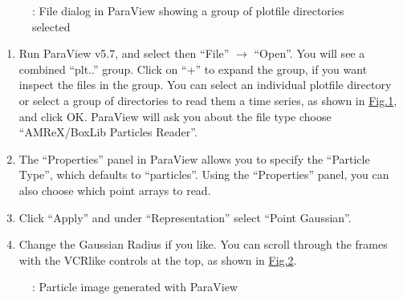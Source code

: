 \documentclass[letterpaper,10pt,english]{sphinxmanual}
\begin{document}
\begin{center}

\begin{figure}[htbp]
\centering
\capstart

\noindent{}
\caption{: File dialog in ParaView showing a group of plotfile directories selected}\label{\detokenize{Visualization:id6}}\label{\detokenize{Visualization:fig-paraview-filegroup}}\end{figure}

\end{center}
\begin{enumerate}
%
\item {} 
\sphinxAtStartPar
Run ParaView v5.7, and select  then  “File” \(\rightarrow\) “Open”. You
will see a combined “plt..” group. Click on “+” to expand the group, if you
want inspect the files in the group. You can select an individual plotfile
directory or select a group of directories to read them a time series, as
shown in \hyperref[\detokenize{Visualization:fig-paraview-filegroup}]{Fig.\@ \ref{\detokenize{Visualization:fig-paraview-filegroup}}}, and click OK. ParaView will ask you about the file type \textendash{} choose “AMReX/BoxLib Particles Reader”.

\item {} 
\sphinxAtStartPar
The “Properties” panel in ParaView allows you to specify the “Particle
Type”, which defaults to “particles”. Using the “Properties” panel, you can
also choose which point arrays to read.

\item {} 
\sphinxAtStartPar
Click “Apply” and under “Representation” select “Point Gaussian”.

\item {} 
\sphinxAtStartPar
Change the Gaussian Radius if you like. You can scroll through the frames
with the VCR\sphinxhyphen{}like controls at the top, as shown in
\hyperref[\detokenize{Visualization:fig-paraview-particles}]{Fig.\@ \ref{\detokenize{Visualization:fig-paraview-particles}}}.

\end{enumerate}

\begin{center}

\begin{figure}[htbp]
\centering
\capstart

\noindent{}
\caption{: Particle image generated with ParaView}\label{\detokenize{Visualization:id7}}\label{\detokenize{Visualization:fig-paraview-particles}}\end{figure}

\end{center}
\end{document}
